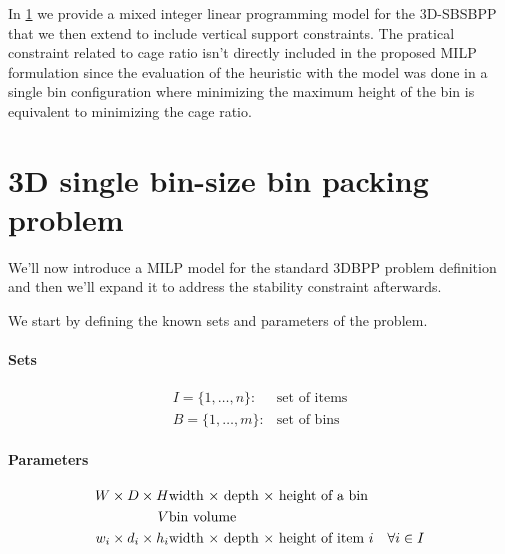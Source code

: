 In \cref{sec:milp} we provide a mixed integer linear programming model for the 3D-SBSBPP that we then extend to include vertical support constraints.
The pratical constraint related to cage ratio isn't directly included in the proposed MILP formulation since the evaluation of the heuristic with the model was done in a single bin configuration where minimizing the maximum height of the bin is equivalent to minimizing the cage ratio.

\section{3D single bin-size bin packing problem}
\label{sec:milp}%
We'll now introduce a MILP model for the standard 3DBPP problem definition and then we'll expand it to address the stability constraint afterwards.

We start by defining the known sets and parameters of the problem.
\paragraph*{Sets}
\begin{eqnarray*}
    I = \{1,\dots, n \}: & \text{set of items} \\
    B = \{1,\dots, m \}: & \text{set of bins} 
\end{eqnarray*}
\paragraph*{Parameters}
\begin{eqnarray}
          W \times D \times H  & \text{width $\times$ depth $\times$ height of a bin} \notag \\
                            V  & \text{bin volume} \notag \\
    w_i \times d_i \times h_i  & \text{width $\times$ depth $\times$ height of item $i$} & \forall i \in I \label{par:item_dim}
\end{eqnarray}

